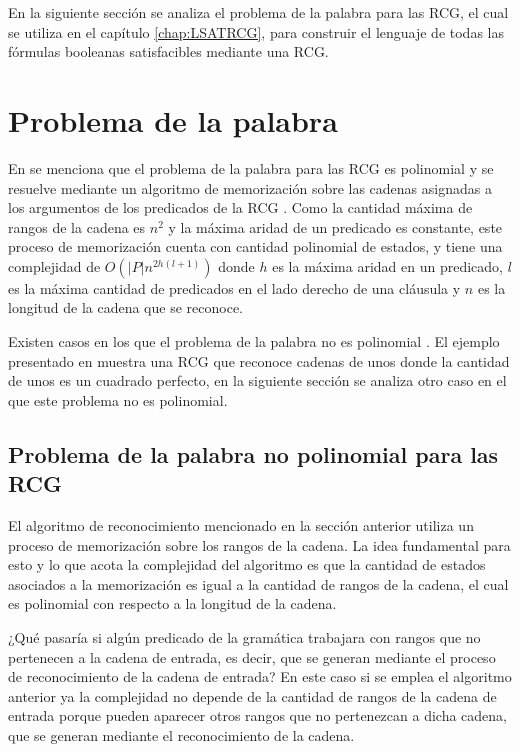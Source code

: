 En la siguiente sección se analiza el problema de la palabra para las RCG, el cual se utiliza en el
capítulo \ref{chap:LSATRCG}, para construir el lenguaje de todas las fórmulas booleanas satisfacibles mediante
una RCG.

\section{Problema de la palabra}

En \cite{mainRCGBib} se menciona que el problema de la palabra para las RCG es polinomial y se resuelve mediante un
algoritmo de memorización sobre las cadenas asignadas a los argumentos de
los predicados de la RCG \cite{mainRCGBib}.  Como la cantidad máxima de rangos de la cadena es $n^2$ y la máxima
aridad de un predicado es constante, este proceso de memorización cuenta con cantidad polinomial de estados,
y tiene una complejidad de $O(|P|n^{2h(l+1)})$ donde $h$ es la máxima aridad en un predicado, $l$ es la máxima
cantidad de predicados en el lado derecho de una cláusula y $n$ es la longitud de la cadena que se reconoce.

Existen casos en los que el problema de la palabra no es polinomial \cite{propertiesRCGBib}.
El ejemplo presentado en \cite{propertiesRCGBib} muestra una RCG que reconoce cadenas de unos donde la cantidad de unos es un cuadrado perfecto,
en la siguiente sección se analiza otro caso en el que este problema no es polinomial.

\subsection{Problema de la palabra no polinomial para las RCG}

El algoritmo de reconocimiento mencionado en la sección anterior utiliza un proceso de memorización sobre los rangos de la cadena.
La idea fundamental para esto y lo que acota la complejidad del algoritmo es que la cantidad de estados
asociados a la memorización es igual a la cantidad de rangos de la cadena, el cual es polinomial con respecto a la longitud de la cadena.

¿Qué pasaría si algún predicado de la gramática trabajara con rangos que no pertenecen a la cadena de entrada, es decir,
que se generan mediante el proceso de reconocimiento de la cadena de entrada? En este caso si se emplea el algoritmo anterior ya la complejidad
no depende de la cantidad de rangos de la cadena de entrada porque pueden aparecer otros rangos que no pertenezcan a dicha cadena, que se generan mediante el reconocimiento de la cadena.

